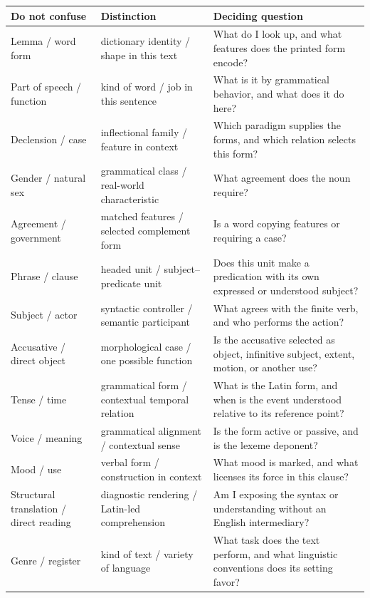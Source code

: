 \begin{xltabular}{\linewidth}{@{}P{1.75in}P{2.15in}Y@{}}
  \toprule
  \textbf{Do not confuse} & \textbf{Distinction} & \textbf{Deciding question} \\
  \midrule\endhead
  Lemma / word form & dictionary identity / shape in this text & What do I look
       up, and what features does the printed form encode? \\
  Part of speech / function & kind of word / job in this sentence & What is it
       by grammatical behavior, and what does it do here? \\
  Declension / case & inflectional family / feature in context & Which paradigm
       supplies the forms, and which relation selects this form? \\
  Gender / natural sex & grammatical class / real-world characteristic & What
       agreement does the noun require? \\
  Agreement / government & matched features / selected complement form & Is a
       word copying features or requiring a case? \\
  Phrase / clause & headed unit / subject--predicate unit & Does this unit make
       a predication with its own expressed or understood subject? \\
  Subject / actor & syntactic controller / semantic participant & What agrees
       with the finite verb, and who performs the action? \\
  Accusative / direct object & morphological case / one possible function & Is
       the accusative selected as object, infinitive subject, extent, motion,
       or another use? \\
  Tense / time & grammatical form / contextual temporal relation & What is the
       Latin form, and when is the event understood relative to its reference
       point? \\
  Voice / meaning & grammatical alignment / contextual sense & Is the form
       active or passive, and is the lexeme deponent? \\
  Mood / use & verbal form / construction in context & What mood is marked, and
       what licenses its force in this clause? \\
  Structural translation / direct reading & diagnostic rendering / Latin-led
       comprehension & Am I exposing the syntax or understanding without an
       English intermediary? \\
  Genre / register & kind of text / variety of language & What task does the
       text perform, and what linguistic conventions does its setting favor? \\
  \bottomrule
\end{xltabular}

